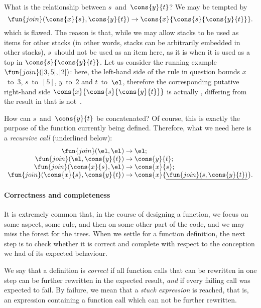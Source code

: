 What is the relationship between \(s\)~and~\(\cons{y}{t}\)? We
may be tempted by
\begin{equation*}
\fun{join}(\cons{x}{s},\cons{y}{t}) \rightarrow
  \cons{x}{\cons{s}{\cons{y}{t}}}.
\end{equation*}
which is flawed. The reason is that, while we may allow stacks to be
used as items for other stacks (in other words, stacks can be
arbitrarily embedded in other stacks), \(s\)~should not be used as an
item here, as it is when it is used as a top in
\(\cons{s}{\cons{y}{t}}\). Let us consider the running example
\(\fun{join}([3,5],[2])\): here, the left\hyp{}hand side of the rule
in question bounds \(x\)~to~\(3\), \(s\)~to~\([5]\), \(y\)~to~\(2\)
and \(t\)~to~\(\el\), therefore the corresponding putative
right\hyp{}hand side \(\cons{x}{\cons{s}{\cons{y}{t}}}\) is actually
, differing from the result
 in that \erlcode{[5]} is
not~.

How can \(s\)~and~\(\cons{y}{t}\) be concatenated? Of course, this is
exactly the purpose of the function  currently being
defined. Therefore, what we need here is a \emph{recursive call}
(underlined below):
\begin{equation*}
\begin{array}{r@{\;}l@{\;}l}
\fun{join}(\el,\el) & \rightarrow & \el;\\
\fun{join}(\el,\cons{y}{t}) & \rightarrow & \cons{y}{t};\\
\fun{join}(\cons{x}{s},\el) & \rightarrow & \cons{x}{s};\\
\fun{join}(\cons{x}{s},\cons{y}{t}) & \rightarrow & \cons{x}{\underline{\fun{join}(s,\cons{y}{t})}}.
\end{array}
\end{equation*}

\paragraph{Correctness and completeness}

It is extremely common that, in the course of designing a function, we
focus on some aspect, some rule, and then on some other part of the
code, and we may miss the forest for the trees. When we settle for a
function definition, the next step is to check whether it is correct
and complete with respect to the conception we had of its expected
behaviour.

We say that a definition is \emph{correct} if all function calls that
can be rewritten in one step can be further rewritten in the expected
result, \emph{and} if every failing call was expected to fail. By
failure, we mean that a \emph{stuck expression} is reached, that is,
an expression containing a function call which can not be further
rewritten.

